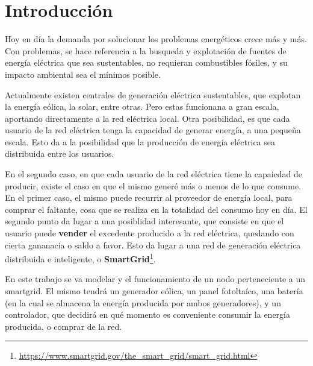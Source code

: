\section{Introducción} Hoy en día la demanda por solucionar los problemas
energéticos crece más y más. Con problemas, se hace referencia a la busqueda
y explotación de fuentes de energía eléctrica que sea sustentables, no
requieran combustibles fósiles, y su impacto ambiental sea el mínimos
posible.

Actualmente existen centrales de generación eléctrica sustentables, que
explotan la energía eólica, la solar, entre otras. Pero estas funcionana a
gran escala, aportando directamente a la red eléctrica local. Otra
posibilidad, es que cada usuario de la red eléctrica tenga la capacidad de
generar energía, a una pequeña escala. Esto da a la posibilidad que la
producción de energía eléctrica sea distribuida entre los usuarios.

En el segundo caso, en que cada usuario de la red eléctrica tiene la
capaicdad de producir, existe el caso en que el mismo generé más o menos de
lo que consume. En el primer caso, el mismo puede recurrir al proveedor de
energía local, para comprar el faltante, cosa que se realiza en la totalidad
del consumo hoy en día. El segundo punto da lugar a una posiblidad
interesante, que consiste en que el usuario puede \textbf{vender} el
excedente producido a la red eléctrica, quedando con cierta gananacia o saldo
a favor. Esto da lugar a una red de generación eléctrica distribuida e
inteligente, o
\textbf{SmartGrid}\footnote{\url{https://www.smartgrid.gov/the_smart_grid/smart_grid.html}}.

En este trabajo se va modelar y el funcionamiento de un nodo perteneciente a
un smartgrid. El mismo tendrá un generador eólica, un panel fotoltaíco, una
batería (en la cual se almacena la energía producida por ambos generadores),
y un controlador, que decidirá en qué momento es conveniente consumir la
energía producida, o comprar de la red.

